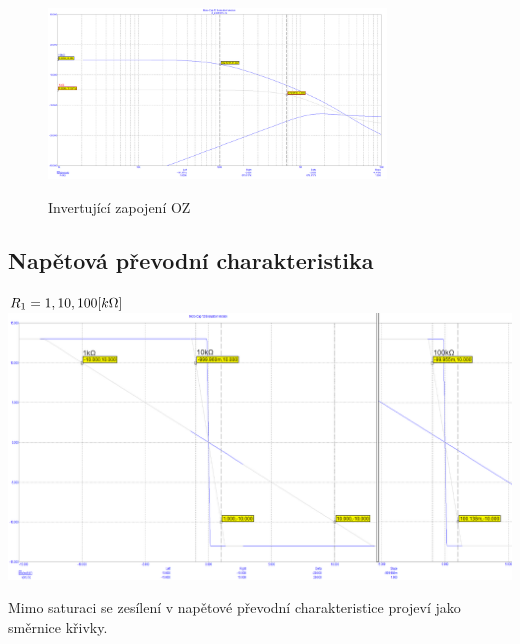 \documentclass{article}
\begin{document}
\begin{figure}[H]
  \centering
  \includegraphics[width=0.8\textwidth]{PC/AC/in_1k.png}
  \begin{center}
    Invertující zapojení OZ
  \end{center}
\end{figure}

\subsection*{Napětová převodní charakteristika}
\begin{minipage}[t]{\textwidth}
  \(R_1 = 1,10,100\-[k\Omega]\)\\
  \includegraphics[width=\textwidth]{PC/DC/in_1k.png}
\end{minipage}
Mimo saturaci se zesílení v napětové převodní charakteristice projeví jako směrnice křivky.
\end{document}
